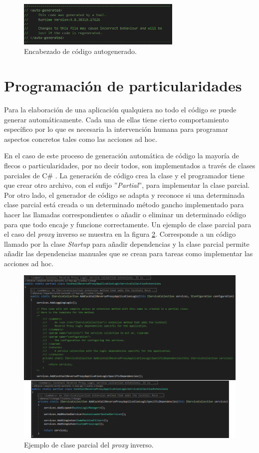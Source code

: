 \documentclass[11pt,spanish,listoffigures]{tfgetsinf}
\begin{document}
\begin{figure}[ht]
\centering
\includegraphics[width=0.7\textwidth]{imagenes/apendice/encabezadoAutogenerado}
\caption{Encabezado de código autogenerado.}
	\label{encabezadoAutogenerado}
\end{figure}

	\section{Programación de particularidades}

Para la elaboración de una aplicación qualquiera no todo el código se puede generar automáticamente. Cada una de ellas tiene cierto comportamiento específico por lo que es necesaria la intervención humana para programar aspectos concretos tales como las acciones ad hoc.

En el caso de este proceso de generación automática de código la mayoría de flecos o particularidades, por no decir todos, son implementados a través de clases parciales de C\# \cite{ClasesParciales}. La generación de código crea la clase y el programador tiene que crear otro archivo, con el sufijo ''\emph{Partial}'', para implementar la clase parcial. Por otro lado, el generador de código se adapta y reconoce si una determinada clase parcial está creada o un determinado método gancho implementado para hacer las llamadas correspondientes o añadir o eliminar un determinado código para que todo encaje y funcione correctamente. Un ejemplo de clase parcial para el caso del \emph{proxy} inverso se muestra en la figura \ref{claseParcial}. Corresponde a un código llamado por la clase \emph{Startup} para añadir dependencias y la clase parcial permite añadir las dependencias manuales que se crean para tareas como implementar las acciones ad hoc.

\begin{figure}[ht]
\centering
\includegraphics[width=1\textwidth]{imagenes/apendice/claseParcial}
\caption{Ejemplo de clase parcial del \emph{proxy} inverso.}
	\label{claseParcial}
\end{figure}
\end{document}
